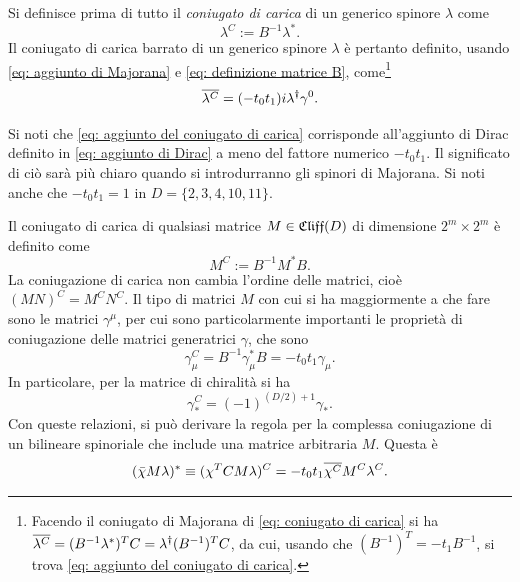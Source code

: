 Si definisce prima di tutto il \emph{coniugato di carica} di un generico spinore $\lambda$ come 
\begin{equation}
\label{eq: coniugato di carica}
    \lambda^C := B^{-1}\lambda^*.
\end{equation}
Il coniugato di carica barrato di un generico spinore $\lambda$ è pertanto definito, usando \eqref{eq: aggiunto di Majorana} e \eqref{eq: definizione matrice B}, come\footnote{Facendo il coniugato di Majorana di \eqref{eq: coniugato di carica} si ha $\overline{\lambda^C} = (B^{-1}\lambda^*)^TC = \lambda^\dag (B^{-1})^TC$, da cui, usando che $(B^{-1})^T = -t_1B^{-1}$, si trova \eqref{eq: aggiunto del coniugato di carica}.} 
\begin{equation}
\label{eq: aggiunto del coniugato di carica}
    \overline{\lambda^C} = (-t_0t_1)i\lambda^\dag\gamma^0.
\end{equation}
\begin{obs}
    Si noti che \eqref{eq: aggiunto del coniugato di carica} corrisponde all'aggiunto di Dirac definito in \eqref{eq: aggiunto di Dirac} a meno del fattore numerico $-t_0t_1$. Il significato di ciò sarà più chiaro quando si introdurranno gli spinori di Majorana. Si noti anche che $-t_0t_1 = 1$ in $D = \{2,3,4,10,11\}$.
\end{obs}
Il coniugato di carica di qualsiasi matrice $M \in \mathfrak{Cliff}(D)$ di dimensione $2^m \times 2^m$ è definito come
\begin{equation}
\label{eq: coniugato di carica matrice M di clifford generica}
    M^C := B^{-1}M^*B.
\end{equation}
La coniugazione di carica non cambia l'ordine delle matrici, cioè $(MN)^C = M^CN^C$. Il tipo di matrici $M$ con cui si ha maggiormente a che fare sono le matrici $\gamma^\mu$, per cui sono particolarmente importanti le proprietà di coniugazione delle matrici generatrici $\gamma$, che sono 
\begin{equation}
\label{eq: coniugato di carica matrice gamma}
    \gamma_\mu^C = B^{-1}\gamma_\mu^*B = -t_0t_1\gamma_\mu.
\end{equation}
In particolare, per la matrice di chiralità si ha
\begin{equation}
\label{eq: coniugato di carica matrice di chiralità}
    \gamma_*^C = (-1)^{(D/2) + 1}\gamma_*.
\end{equation}
Con queste relazioni, si può derivare la regola per la complessa coniugazione di un bilineare spinoriale che include una matrice arbitraria $M$. Questa è 
\begin{equation}
\label{eq: coniugato di carica di un bilineare}
    (\bar{\chi}M\lambda)^* \equiv (\chi^TCM\lambda)^C = -t_0t_1\overline{\chi^C}M^C\lambda^C.
\end{equation}
